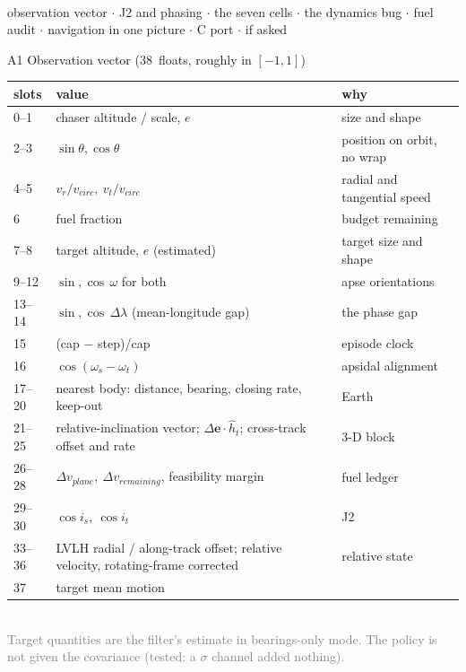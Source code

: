 \documentclass[aspectratio=169,11pt]{beamer}
\newcommand{\dv}{\ensuremath{\Delta v}}
\newcommand{\nObs}{38}
\begin{document}
\appendix
\begin{frame}[plain]\\[2mm]\small observation vector \;$\cdot$\; J2 and phasing \;$\cdot$\; the seven cells \;$\cdot$\; the dynamics bug \;$\cdot$\; fuel audit \;$\cdot$\; navigation in one picture \;$\cdot$\; C port \;$\cdot$\; if asked\end{frame}

\begin{frame}{A1 \; Observation vector (\nObs\ floats, roughly in $[-1,1]$)}
\tiny
\begin{tabular}{@{}lll@{}}
\toprule
slots & value & why\\
\midrule
0--1 & chaser altitude / scale, $e$ & size and shape\\
2--3 & $\sin\theta,\cos\theta$ & position on orbit, no wrap\\
4--5 & $v_r/v_{circ},\ v_t/v_{circ}$ & radial and tangential speed\\
6 & fuel fraction & budget remaining\\
7--8 & target altitude, $e$ (estimated) & target size and shape\\
9--12 & $\sin,\cos\,\omega$ for both & apse orientations\\
13--14 & $\sin,\cos\,\Delta\lambda$ (mean-longitude gap) & the phase gap\\
15 & (cap $-$ step)/cap & episode clock\\
16 & $\cos(\omega_s-\omega_t)$ & apsidal alignment\\
17--20 & nearest body: distance, bearing, closing rate, keep-out & Earth\\
21--25 & relative-inclination vector; $\Delta\mathbf e\cdot\hat h_t$; cross-track offset and rate & 3-D block\\
26--28 & $\dv_{plane},\ \dv_{remaining}$, feasibility margin & fuel ledger\\
29--30 & $\cos i_s,\ \cos i_t$ & J2\\
33--36 & LVLH radial / along-track offset; relative velocity, rotating-frame corrected & relative state\\
37 & target mean motion & \\
\bottomrule
\end{tabular}
\\[1mm]\textcolor{grey}{Target quantities are the filter's estimate in bearings-only mode. The policy is not given the covariance (tested: a $\sigma$ channel added nothing).}
\end{frame}
\end{document}
